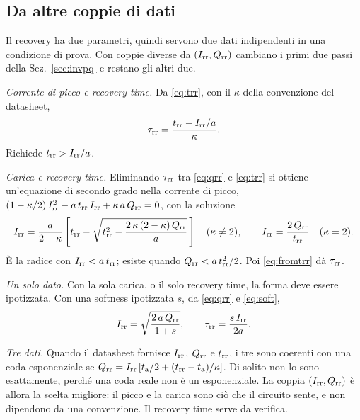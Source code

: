 \documentclass[10pt,a4paper]{scrartcl}
\let\newcommand\lmitdefine
\newcommand{\Irr}{I_\mathrm{rr}}
\newcommand{\Qrr}{Q_\mathrm{rr}}
\newcommand{\trr}{t_\mathrm{rr}}
\newcommand{\ta}{t_\mathrm{a}}
\newcommand{\taurr}{\tau_\mathrm{rr}}
\begin{document}
\subsection{Da altre coppie di dati}
\label{sec:pairs}
Il recovery ha due parametri, quindi servono due dati indipendenti in una condizione di prova. Con coppie diverse da $(\Irr, \Qrr)$ cambiano i primi due passi della Sez.~\ref{sec:invpq} e restano gli altri due.

\emph{Corrente di picco e recovery time.} Da \eqref{eq:trr}, con il $\kappa$ della convenzione del datasheet,
\begin{equation}
\taurr = \frac{\trr - \Irr/a}{\kappa} .
\label{eq:fromtrr}
\end{equation}
Richiede $\trr > \Irr/a$.

\emph{Carica e recovery time.} Eliminando $\taurr$ tra \eqref{eq:qrr} e \eqref{eq:trr} si ottiene un'equazione di secondo grado nella corrente di picco, $(1-\kappa/2)\,\Irr^2 - a\,\trr\,\Irr + \kappa\,a\,\Qrr = 0$, con la soluzione
\begin{equation}
\Irr = \frac{a}{2-\kappa}\left[\trr - \sqrt{\trr^2 - \frac{2\,\kappa\,(2-\kappa)\,\Qrr}{a}}\,\right] \quad (\kappa \neq 2) , \qquad \Irr = \frac{2\,\Qrr}{\trr} \quad (\kappa = 2) .
\label{eq:fromqt}
\end{equation}
È la radice con $\Irr < a\,\trr$; esiste quando $\Qrr < a\,\trr^2/2$. Poi \eqref{eq:fromtrr} dà $\taurr$.

\emph{Un solo dato.} Con la sola carica, o il solo recovery time, la forma deve essere ipotizzata. Con una softness ipotizzata $s$, da \eqref{eq:qrr} e \eqref{eq:soft},
\begin{equation}
\Irr = \sqrt{\frac{2\,a\,\Qrr}{1+s}} , \qquad \taurr = \frac{s\,\Irr}{2a} .
\label{eq:fromq}
\end{equation}

\emph{Tre dati.} Quando il datasheet fornisce $\Irr$, $\Qrr$ e $\trr$, i tre sono coerenti con una coda esponenziale se $\Qrr = \Irr\,[\ta/2 + (\trr-\ta)/\kappa]$. Di solito non lo sono esattamente, perché una coda reale non è un esponenziale. La coppia $(\Irr, \Qrr)$ è allora la scelta migliore: il picco e la carica sono ciò che il circuito sente, e non dipendono da una convenzione. Il recovery time serve da verifica.
\end{document}
